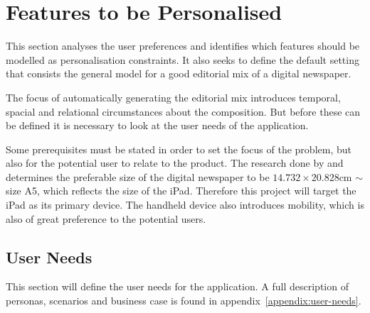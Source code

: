 \chapter{Features to be Personalised} %
\label{ch:analysis}
This section analyses the user preferences and identifies which features should be modelled as personalisation constraints. It also seeks to define the default setting that consists the general model for a good editorial mix of a digital newspaper.

The focus of automatically generating the editorial mix introduces temporal, spacial and relational circumstances about the composition. But before these can be defined it is necessary to look at the user needs of the application.
%

Some prerequisites must be stated in order to set the focus of the problem, but also for the potential user to relate to the product. The research done by \cite[p. 1]{FULLTEXT01.pdf} and \cite[p. 6-7]{kristin_fredrik.pdf} determines the preferable size of the digital newspaper to be $14.732 \times 20.828$cm $\sim$ size A5, which reflects the size of the iPad. Therefore this project will target the iPad as its primary device. The handheld device also introduces mobility, which is also of great preference to the potential users.
%

\section{User Needs}
This section will define the user needs for the application. A full description of personas, scenarios and business case is found in appendix~\vref{appendix:user-needs}.


